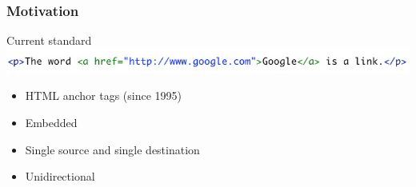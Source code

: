 \begin{frame}
\frametitle{Motivation}
	\begin{block}{Current standard}
		\includegraphics[width=1\textwidth]{./images/hyperlink.png}
		\begin{itemize}
			\item HTML anchor tags (since 1995)
			\item Embedded
			\item Single source and single destination
			\item Unidirectional
		\end{itemize}
	\end{block}
\end{frame}
